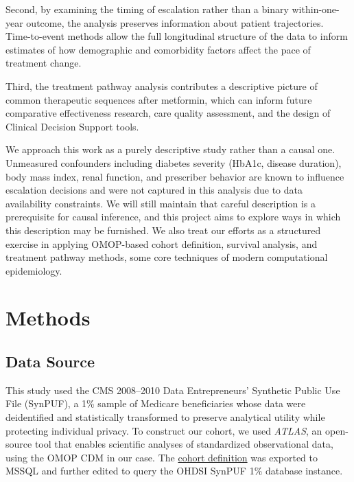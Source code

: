 \documentclass[twoside,11pt]{article}
\begin{document}
Second, by examining the timing of escalation rather than a binary within-one-year outcome, the analysis preserves information about patient trajectories. Time-to-event methods allow the full longitudinal structure of the data to inform estimates of how demographic and comorbidity factors affect the pace of treatment change.

Third, the treatment pathway analysis contributes a descriptive picture of common therapeutic sequences after metformin, which can inform future comparative effectiveness research, care quality assessment, and the design of Clinical Decision Support tools.

We approach this work as a purely descriptive study rather than a causal one. Unmeasured confounders including diabetes severity (HbA1c, disease duration), body mass index, renal function, and prescriber behavior are known to influence escalation decisions and were not captured in this analysis due to data availability constraints. We will still maintain that careful description is a prerequisite for causal inference, and this project aims to explore ways in which this description may be furnished. We also treat our efforts as a structured exercise in applying OMOP-based cohort definition, survival analysis, and treatment pathway methods, some core techniques of modern computational epidemiology.


\section*{Methods}

\subsection*{Data Source}

This study used the CMS 2008--2010 Data Entrepreneurs' Synthetic Public Use File (SynPUF), a 1\% sample of Medicare beneficiaries whose data were deidentified and statistically transformed to preserve analytical utility while protecting individual privacy. To construct our cohort, we used \textit{ATLAS}, an open-source tool that enables scientific analyses of standardized observational data, using the OMOP CDM in our case. The \href{https://atlas-demo.ohdsi.org/#/cohortdefinition/1796944/definition}{cohort definition} was exported to MSSQL and further edited to query the OHDSI SynPUF 1\% database instance.
\end{document}
